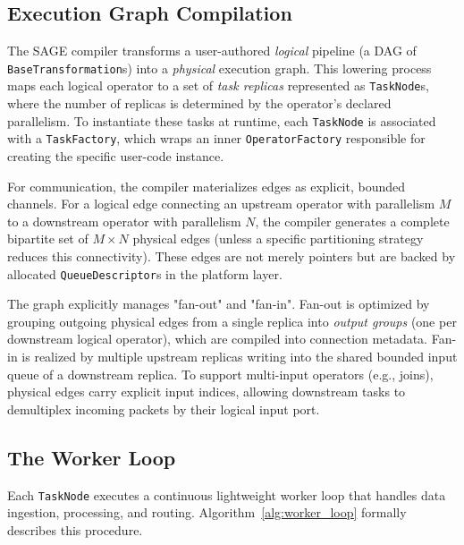 \subsection{Execution Graph Compilation}
\label{subsec:app_graph}
The SAGE compiler transforms a user-authored \emph{logical} pipeline (a DAG of \texttt{BaseTransformation}s) into a \emph{physical} execution graph. This lowering process maps each logical operator to a set of \emph{task replicas} represented as \texttt{TaskNode}s, where the number of replicas is determined by the operator's declared parallelism. To instantiate these tasks at runtime, each \texttt{TaskNode} is associated with a \texttt{TaskFactory}, which wraps an inner \texttt{OperatorFactory} responsible for creating the specific user-code instance.

For communication, the compiler materializes edges as explicit, bounded channels. For a logical edge connecting an upstream operator with parallelism $M$ to a downstream operator with parallelism $N$, the compiler generates a complete bipartite set of $M \times N$ physical edges (unless a specific partitioning strategy reduces this connectivity). These edges are not merely pointers but are backed by allocated \texttt{QueueDescriptor}s in the platform layer.

The graph explicitly manages "fan-out" and "fan-in". Fan-out is optimized by grouping outgoing physical edges from a single replica into \emph{output groups} (one per downstream logical operator), which are compiled into connection metadata. Fan-in is realized by multiple upstream replicas writing into the shared bounded input queue of a downstream replica. To support multi-input operators (e.g., joins), physical edges carry explicit input indices, allowing downstream tasks to demultiplex incoming packets by their logical input port.

\subsection{The Worker Loop}
\label{subsec:app_worker}
Each \texttt{TaskNode} executes a continuous lightweight worker loop that handles data ingestion, processing, and routing. Algorithm~\ref{alg:worker_loop} formally describes this procedure.


